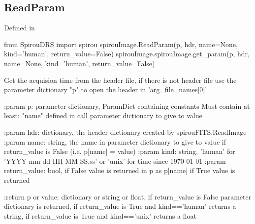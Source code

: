 \begin{minipage}{\textwidth}
\subsection{ReadParam}

Defined in \spirouImage{}

\begin{pythonbox}
from SpirouDRS import spirou
spirouImage.ReadParam(p, hdr, name=None, kind='human', return_value=False)
spirouImage.spirouImage.get_param(p, hdr, name=None, kind='human', return_value=False)
\end{pythonbox}

\begin{pythondocstring}
Get the acquision time from the header file, if there is not header file
use the parameter dictionary "p" to open the header in 'arg_file_names[0]'

:param p: parameter dictionary, ParamDict containing constants
    Must contain at least:
        "name" defined in call
        parameter dictionary to give to value

:param hdr: dictionary, the header dictionary created by
            spirouFITS.ReadImage
:param name: string, the name in parameter dictionary to give to value
             if return_value is False (i.e. p[name] = value)
:param kind: string, 'human' for 'YYYY-mm-dd-HH-MM-SS.ss' or 'unix'
             for time since 1970-01-01
:param return_value: bool, if False value is returned in p as p[name]
                     if True value is returned

:return p or value: dictionary or string or float, if return_value is False
                    parameter dictionary is returned, if return_value is
                    True and kind=='human' returns a string, if return_value
                    is True and kind=='unix' returns a float
\end{pythondocstring}
\end{minipage}


